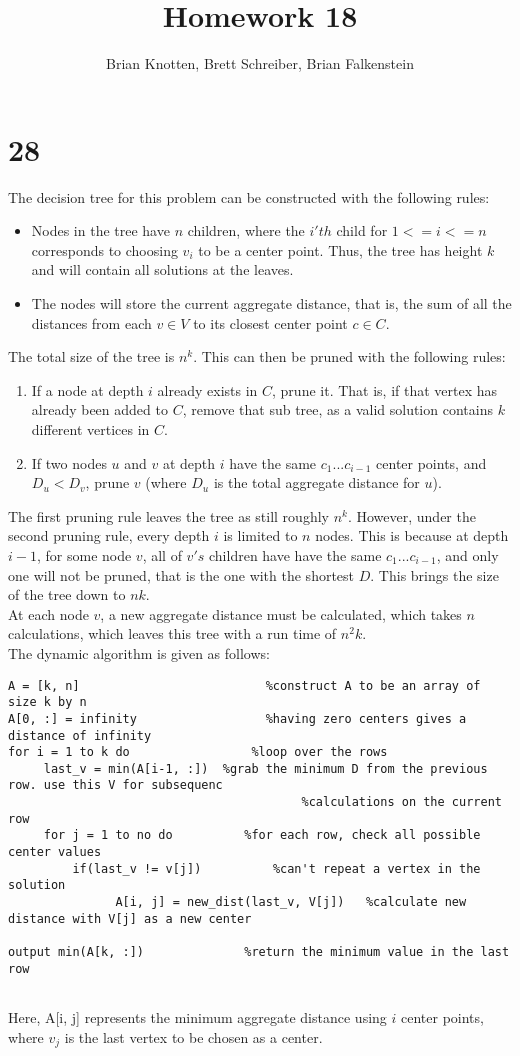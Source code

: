 \documentclass[letterpaper,notitlepage,twoside]{article}
\begin{document}
\title{Homework 18}
\author{Brian Knotten, Brett Schreiber, Brian Falkenstein}
\maketitle

\section*{28}
The decision tree for this problem can be constructed with the following rules:
\begin{itemize}
\item Nodes in the tree have $n$ children, where the $i'th$ child for $1<=i<=n$ corresponds to choosing $v_i$ to be a center point. Thus, the tree has height $k$ and will contain all solutions at the leaves.  
\item The nodes will store the current aggregate distance, that is, the sum of all the distances from each $v\in V$ to its closest center point $c\in C$. 
\end{itemize}
The total size of the tree is $n^k$. This can then be pruned with the following rules:
\begin{enumerate}
\item If a node at depth $i$ already exists in $C$, prune it. That is, if that vertex has already been added to $C$, remove that sub tree, as a valid solution contains $k$ different vertices in $C$. 
\item If two nodes $u$ and $v$ at depth $i$ have the same $c_1...c_{i-1}$ center points, and $D_u < D_v$, prune $v$ (where $D_u$ is the total aggregate distance for $u$). 
\end {enumerate}
The first pruning rule leaves the tree as still roughly $n^k$. However, under the second pruning rule, every depth $i$ is limited to $n$ nodes. This is because at depth $i-1$, for some node $v$, all of $v's$ children have have the same $c_1...c_{i-1}$, and only one will not be pruned, that is the one with the shortest $D$. This brings the size of the tree down to $nk$.\\
At each node $v$, a new aggregate distance must be calculated, which takes $n$ calculations, which leaves this tree with a run time of $n^2 k$. \\
The dynamic algorithm is given as follows:
\begin{verbatim}
A = [k, n]                          %construct A to be an array of size k by n
A[0, :] = infinity                  %having zero centers gives a distance of infinity
for i = 1 to k do                 %loop over the rows
     last_v = min(A[i-1, :])  %grab the minimum D from the previous row. use this V for subsequenc
                                         %calculations on the current row
     for j = 1 to no do          %for each row, check all possible center values
         if(last_v != v[j])          %can't repeat a vertex in the solution
               A[i, j] = new_dist(last_v, V[j])   %calculate new distance with V[j] as a new center
               
output min(A[k, :])              %return the minimum value in the last row
          
\end{verbatim}
Here, A[i, j] represents the minimum aggregate distance using $i$ center points, where $v_j$ is the last vertex to be chosen as a center.
\end{document}
